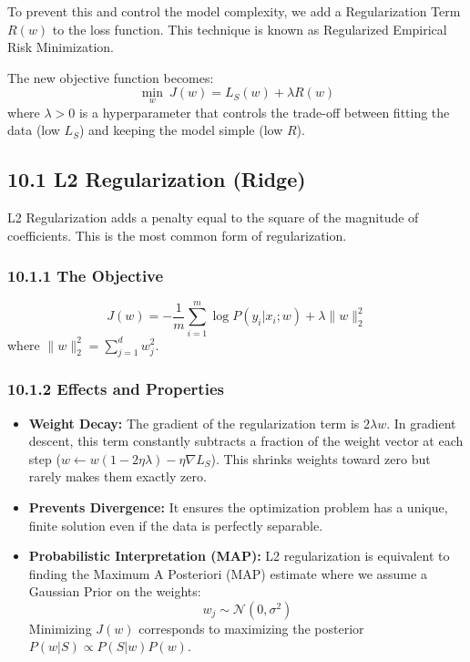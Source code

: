 \documentclass[
  italian,
  11pt,
]{article}
\providecommand{\tightlist}{%
  \setlength{\itemsep}{0pt}\setlength{\parskip}{0pt}}
\begin{document}
To prevent this and control the model complexity, we add a
Regularization Term \(R(w)\) to the loss function. This technique is
known as Regularized Empirical Risk Minimization.

The new objective function becomes:
\[\min_{w} \ J(w) = L_S(w) + \lambda R(w)\] where \(\lambda > 0\) is a
hyperparameter that controls the trade-off between fitting the data (low
\(L_S\)) and keeping the model simple (low \(R\)).

\subsection{10.1 L2 Regularization
(Ridge)}\label{l2-regularization-ridge}

L2 Regularization adds a penalty equal to the square of the magnitude of
coefficients. This is the most common form of regularization.

\subsubsection{10.1.1 The Objective}\label{the-objective}

\[J(w) = -\frac{1}{m} \sum_{i=1}^{m} \log P(y_i | x_i; w) + \lambda \|w\|_2^2\]
where \(\|w\|_2^2 = \sum_{j=1}^{d} w_j^2\).

\subsubsection{10.1.2 Effects and
Properties}\label{effects-and-properties}

\begin{itemize}
\tightlist
\item
  \textbf{Weight Decay:} The gradient of the regularization term is
  \(2\lambda w\). In gradient descent, this term constantly subtracts a
  fraction of the weight vector at each step
  (\(w \leftarrow w(1 - 2\eta\lambda) - \eta \nabla L_S\)). This shrinks
  weights toward zero but rarely makes them exactly zero.
\item
  \textbf{Prevents Divergence:} It ensures the optimization problem has
  a unique, finite solution even if the data is perfectly separable.
\item
  \textbf{Probabilistic Interpretation (MAP):} L2 regularization is
  equivalent to finding the Maximum A Posteriori (MAP) estimate where we
  assume a Gaussian Prior on the weights:
  \[w_j \sim \mathcal{N}(0, \sigma^2)\] Minimizing \(J(w)\) corresponds
  to maximizing the posterior \(P(w | S) \propto P(S | w) P(w)\).
\end{itemize}
\end{document}
